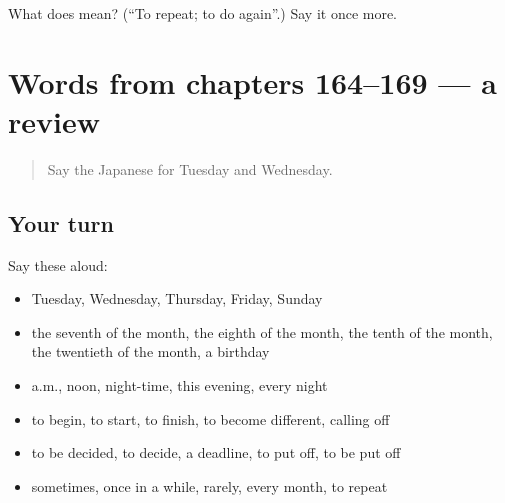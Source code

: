 \begin{tcolorbox}[breakable,colback=teal!4,colframe=teal!35!black,title={Before you move on}]
What does  mean? (\textquotedblleft{}To repeat; to do again\textquotedblright{}.) Say it once more.
\end{tcolorbox}
\section[(dialogue)]{Words from chapters 164–169 — a review}

\label{lesson:JA-R169-review-164-169}



\begin{quote}
Say the Japanese for Tuesday and Wednesday.
\end{quote}

\subsection*{Your turn}
Say these aloud:

\begin{itemize}
\raggedright
  \item Tuesday, Wednesday, Thursday, Friday, Sunday
  \item the seventh of the month, the eighth of the month, the tenth of the month, the twentieth of the month, a birthday
  \item a.m., noon, night-time, this evening, every night
  \item to begin, to start, to finish, to become different, calling off
  \item to be decided, to decide, a deadline, to put off, to be put off
  \item sometimes, once in a while, rarely, every month, to repeat
\end{itemize}

